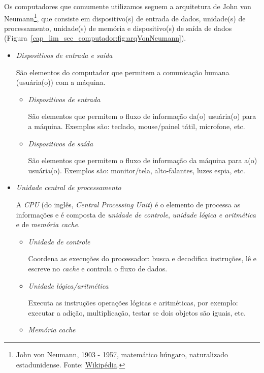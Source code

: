 Os computadores que comumente utilizamos seguem a arquitetura de John von Neumann\footnote{John von Neumann, 1903 - 1957, matemático húngaro, naturalizado estadunidense. Fonte: \href{https://pt.wikipedia.org/wiki/John_von_Neumann}{Wikipédia}.}, que consiste em dispositivo(s) de entrada de dados, unidade(s) de processamento, unidade(s) de memória e dispositivo(s) de saída de dados (Figura~\ref{cap_lim_sec_computador:fig:arqVonNeumann}).

\begin{itemize}
\item \emph{Dispositivos de entrada e saída}

  São elementos do computador que permitem a comunicação humana (usuária(o)) com a máquina.

  \begin{itemize}
  \item \emph{Dispositivos de entrada}

    São elementos que permitem o fluxo de informação da(o) usuária(o) para a máquina. Exemplos são: teclado, mouse/painel tátil, microfone, etc.

  \item \emph{Dispositivos de saída}

    São elementos que permitem o fluxo de informação da máquina para a(o) usuária(o). Exemplos são: monitor/tela, alto-falantes, luzes espia, etc.
  \end{itemize}

\item \emph{Unidade central de processamento}

  A \emph{CPU} (do inglês, {\it Central Processing Unit}) é o elemento de processa as informações e é composta de \emph{unidade de controle}, \emph{unidade lógica e aritmética} e de \emph{memória cache}.

  \begin{itemize}
  \item \emph{Unidade de controle}

    Coordena as execuções do processador: busca e decodifica instruções, lê e escreve no {\it cache} e controla o fluxo de dados.

  \item \emph{Unidade lógica/aritmética}

    Executa as instruções operações lógicas e aritméticas, por exemplo: executar a adição, multiplicação, testar se dois objetos são iguais, etc.

  \item \emph{Memória cache}


\end{itemize}
\end{itemize}
